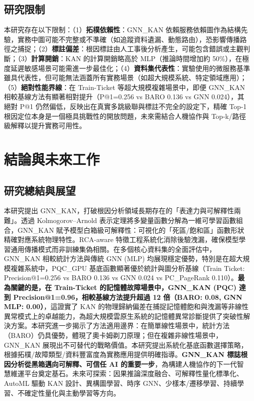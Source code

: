 \documentclass[10pt,a4paper,twocolumn]{article}
\begin{document}
\subsection{研究限制}

本研究存在以下限制：（1）\textbf{拓樸依賴性}：GNN\_KAN 依賴服務依賴圖作為結構先驗，實務中圖可能不完整或不準確（如追蹤資料遺漏、動態路由），恐影響傳播路徑之捕捉；（2）\textbf{標註偏差}：根因標註由人工事後分析產生，可能包含錯誤或主觀判斷；（3）\textbf{計算開銷}：KAN 的計算開銷略高於 MLP（推論時間增加約 50\%），在極度延遲敏感場景可能需進一步最佳化；（4）\textbf{資料集代表性}：實驗使用的微服務基準雖具代表性，但可能無法涵蓋所有實務場景（如超大規模系統、特定領域應用）；（5）\textbf{絕對性能界線}：在 Train-Ticket 等超大規模複雜場景中，即便 GNN\_KAN 相較基線方法有顯著相對提升（P@1=0.256 vs BARO 0.136 vs GNN 0.024），其絕對 P@1 仍然偏低，反映出在真實多跳級聯與標註不完全的設定下，精確 Top-1 根因定位本身是一個極具挑戰性的開放問題，未來需結合人機協作與 Top-k/路徑級解釋以提升實務可用性。

\section{結論與未來工作}

\subsection{研究總結與展望}

本研究提出 GNN\_KAN，打破根因分析領域長期存在的「表達力與可解釋性兩難」。透過 Kolmogorov–Arnold 表示定理將多變量函數分解為一維可學習函數組合，GNN\_KAN 賦予模型白箱級可解釋性：可視化的「死區/飽和區」函數形狀精確對應系統物理特性。RCA-aware 特徵工程系統化消除後驗洩漏，確保模型學習通用傳播模式而非訓練集偽相關。在多個核心資料集的全面評估中，GNN\_KAN 相較統計方法與傳統 GNN (MLP) 均展現穩定優勢，特別是在超大規模複雜系統中，PQC\_GPU 基底函數顯著優於統計與圖分析基線（Train Ticket: Precision@1=0.256 vs BARO 0.136 vs GNN 0.024 vs PC\_PageRank 0.110）。\textbf{最為關鍵的是，在 Train-Ticket 的記憶體故障場景中，GNN\_KAN (PQC) 達到 Precision@1=0.96，相較基線方法提升超過 12 倍（BARO: 0.08, GNN MLP: 0.00）}，這證實了 KAN 的物理歸納偏差在捕捉記憶體飽和與洩漏等非線性異常模式上的卓越能力，為超大規模雲原生系統的記憶體異常診斷提供了突破性解決方案。本研究進一步揭示了方法適用邊界：在簡單線性場景中，統計方法（BARO）仍具優勢，體現了奧卡姆剃刀原理；但在複雜非線性場景中，GNN\_KAN 展現出不可替代的戰略價值。本研究提出系統化基底函數選擇策略，根據拓樸/故障類型/資料豐富度為實務應用提供明確指導。\textbf{GNN\_KAN 標誌根因分析從黑箱邁向可解釋、可信任 AI 的重要一步}，為構建人機協作的下一代智慧維運平台奠定基石。未來可探索：因果推論深度融合、可解釋性量化標準化、AutoML 驅動 KAN 設計、異構圖學習、時序 GNN、少樣本/遷移學習、持續學習、不確定性量化與主動學習等方向。
\end{document}
